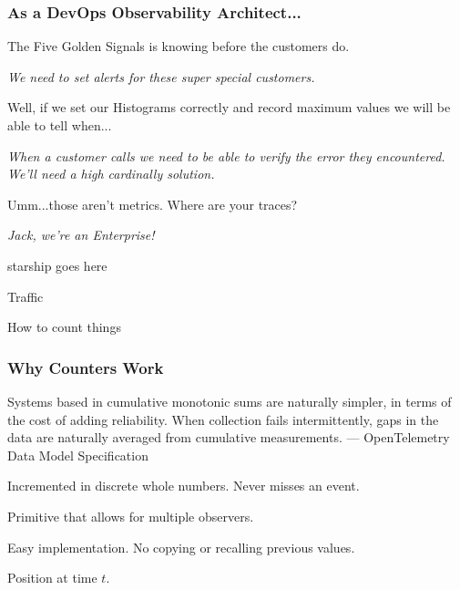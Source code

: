 \begin{frame}
    \frametitle{As a DevOps Observability Architect...}

    The  Five Golden Signals is knowing before the customers do.

    \begin{quotebox}
        \emph{We need to set alerts for these super special customers.}
    \end{quotebox}

    Well, if we set our Histograms correctly and record maximum values we will
    be able to tell when...

    \begin{quotebox}
        \emph{When a customer calls we need to be able to verify the error
            they encountered.  We'll need a high cardinally solution.}
    \end{quotebox}

    Umm...those aren't metrics.  Where are your traces?

    \begin{quotebox}
        \emph{Jack, we're an Enterprise!}
    \end{quotebox}
\end{frame}

\begin{frame}
    starship goes here
\end{frame}

\begin{frame}[standout]
    Traffic

    \small{How to count things}
\end{frame}


\begin{frame}
    \frametitle{Why Counters Work}

    \begin{quotebox}
         Systems based in cumulative monotonic sums are naturally simpler, in
         terms of the cost of adding reliability. When collection fails
         intermittently, gaps in the data are naturally averaged from
         cumulative measurements.
         \tcblower
         \hfill --- OpenTelemetry Data Model Specification
    \end{quotebox}

    \begin{description}[labelwidth=\widthof{Synchronization}]
        \item[Accurate] Incremented in discrete whole numbers.  Never misses an event.
        \item[Synchronization] Primitive that allows for multiple observers.
        \item[Low Overhead] Easy implementation.  No copying or recalling previous values.
        \item[Fundamental] Position at time $t$.
    \end{description}

\end{frame}

